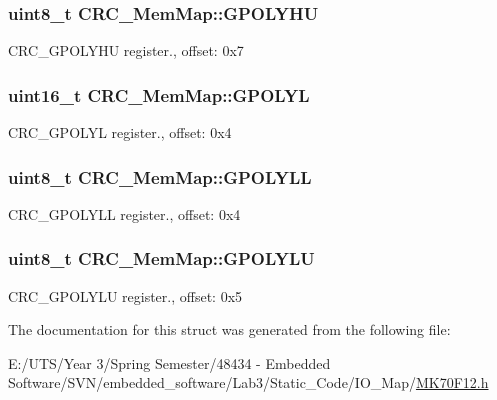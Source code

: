 \subsubsection[{G\+P\+O\+L\+Y\+H\+U}]{\setlength{\rightskip}{0pt plus 5cm}uint8\+\_\+t C\+R\+C\+\_\+\+Mem\+Map\+::\+G\+P\+O\+L\+Y\+H\+U}\label{struct_c_r_c___mem_map_ae7c166006427c82d21b88417313cf511}
C\+R\+C\+\_\+\+G\+P\+O\+L\+Y\+H\+U register., offset\+: 0x7 \hypertarget{struct_c_r_c___mem_map_a4cd3b43b213defbaa07381a32b24af67}{}
\subsubsection[{G\+P\+O\+L\+Y\+L}]{\setlength{\rightskip}{0pt plus 5cm}uint16\+\_\+t C\+R\+C\+\_\+\+Mem\+Map\+::\+G\+P\+O\+L\+Y\+L}\label{struct_c_r_c___mem_map_a4cd3b43b213defbaa07381a32b24af67}
C\+R\+C\+\_\+\+G\+P\+O\+L\+Y\+L register., offset\+: 0x4 \hypertarget{struct_c_r_c___mem_map_afefe4288aecf5a31ca6f6d64317eeb4b}{}
\subsubsection[{G\+P\+O\+L\+Y\+L\+L}]{\setlength{\rightskip}{0pt plus 5cm}uint8\+\_\+t C\+R\+C\+\_\+\+Mem\+Map\+::\+G\+P\+O\+L\+Y\+L\+L}\label{struct_c_r_c___mem_map_afefe4288aecf5a31ca6f6d64317eeb4b}
C\+R\+C\+\_\+\+G\+P\+O\+L\+Y\+L\+L register., offset\+: 0x4 \hypertarget{struct_c_r_c___mem_map_a0ba8bc9ddb8de4ca001f205f32cdd626}{}
\subsubsection[{G\+P\+O\+L\+Y\+L\+U}]{\setlength{\rightskip}{0pt plus 5cm}uint8\+\_\+t C\+R\+C\+\_\+\+Mem\+Map\+::\+G\+P\+O\+L\+Y\+L\+U}\label{struct_c_r_c___mem_map_a0ba8bc9ddb8de4ca001f205f32cdd626}
C\+R\+C\+\_\+\+G\+P\+O\+L\+Y\+L\+U register., offset\+: 0x5 

The documentation for this struct was generated from the following file\+:\begin{DoxyCompactItemize}
\item 
E\+:/\+U\+T\+S/\+Year 3/\+Spring Semester/48434 -\/ Embedded Software/\+S\+V\+N/embedded\+\_\+software/\+Lab3/\+Static\+\_\+\+Code/\+I\+O\+\_\+\+Map/\hyperlink{_m_k70_f12_8h}{M\+K70\+F12.\+h}\end{DoxyCompactItemize}
